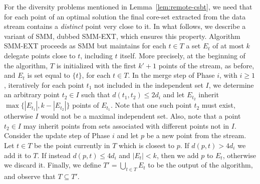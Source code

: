 \documentclass{article}
\begin{document}
For the diversity problems mentioned in Lemma~\ref{lem:remote-csbt},
we need that for each point of an optimal solution the final core-set
extracted from the data stream contains a \emph{distinct} point very
close to it.  In what follows, we describe a variant of {\sc SMM},
dubbed {\sc SMM-EXT}, which ensures this property. Algorithm {\sc
  SMM-EXT} proceeds as {\sc SMM} but maintains for each $t\in T$ a set
$E_t$ of at most $k$ delegate points close to $t$, including $t$
itself. More precisely, at the beginning of the algorithm, $T$ is
initialized with the first $k'+1$ points of the stream, as before, and
$E_t$ is set equal to $\{t\}$, for each $t \in T$. In the merge step
of Phase $i$, with $i \ge 1$, iteratively for each point $t_1$ not
included in the independent set $I$, we determine an arbitrary point
$t_2 \in I$ such that $d(t_1, t_2)\le 2d_i$ and let $E_{t_2}$ inherit
$\max\{|E_{t_1}|,k-|E_{t_2}|\}$ points of $E_{t_1}$. Note that one
such point $t_2$ must exist, otherwise $I$ would not be a maximal
independent set. Also, note that a point $t_2 \in I$ may inherit
points from sets associated with different points not in $I$. Consider
the update step of Phase $i$ and let $p$ be a new point from the
stream. Let $t \in T$ be the point currently in $T$ which is closest
to $p$. If $d(p, t) > 4d_i$ we add it to $T$. If instead
$d(p,t) \le 4d_i$ and $|E_t| < k$, then we add $p$ to $E_t$, otherwise
we discard it. Finally, we define $T'=\bigcup_{t\in T} E_t$ to be the
output of the algorithm, and observe that $T \subseteq T'$.
\end{document}
